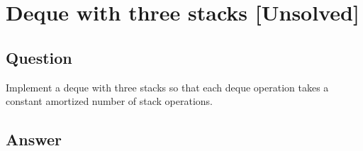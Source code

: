 \section{Deque with three stacks [Unsolved]}

\subsection*{Question}
Implement a deque with three stacks so that each
deque operation takes a constant amortized number of stack operations.

\subsection*{Answer}
